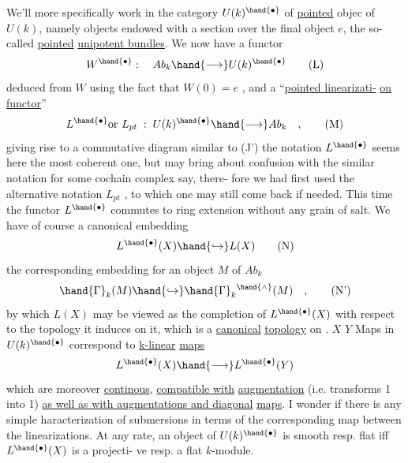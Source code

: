 
We'll more specifically work in the category $U(k)^\hand{\bullet}$ of \uline{pointed} objec
of $U(k)$, namely objects endowed with a section over the final object $e$,
the so-called \uline{pointed} \uline{unipotent bundles}. We now have a functor
\[ W^\hand{\bullet} : \quad Ab_k \hand{\longrightarrow} U(k)^\hand{\bullet} \tag{L} \]
deduced from $W$ using the fact that $W(0)=e$ , and a ``\uline{pointed linearizati-}%
\uline{on functor}''
\[ L^\hand{\bullet} \text{or } L_{pt} \;:\; U(k)^\hand{\bullet} \hand{\longrightarrow} Ab_k \quad , \tag{M} \]
giving rise to a commutative diagram similar to (J')
the notation $L^\hand{\bullet}$ seems here the most coherent one, but may bring about
confusion with the similar notation for some cochain complex say, there-%
fore we had first used the alternative notation $L_{pt}$ , to which one may
still come back if needed. This time the functor $L^\hand{\bullet}$ commutes to ring
extension without any grain of salt. We have of course a canonical
embedding
\[ L^\hand{\bullet}(X) \hand{\hookrightarrow} L(X) \tag{N} \]
  the corresponding embedding for an object $M$ of $Ab_k$
\[ \hand{\Gamma}_k(M) \hand{\hookrightarrow} \hand{\Gamma}_k{}^{\hand{\wedge}}(M) \quad , \tag{N'} \]
by which $L(X)$ may be viewed as the completion of $L^\hand{\bullet}(X)$ with respect to
the topology it induces on it, which is a \uline{canonical} \uline{topology} on .
$X$ \quad $Y$
Maps in $U(k)^\hand{\bullet}$ correspond to \uline{k-linear} \uline{maps}
\[ L^\hand{\bullet}(X) \hand{\longrightarrow} L^\hand{\bullet}(Y) \]
which are moreover \uline{continous},  \uline{compatible with} \uline{augmentation}
(i.e. transforms 1 into 1) \uline{as well as with augmentations and diagonal}
\uline{maps}. I wonder if there is any simple haracterization of submersions
 in terms of the corresponding map between the linearizations. At any
rate, an object  of $U(k)^\hand{\bullet}$ is smooth resp. flat iff $L^\hand{\bullet}(X)$ is a projecti-%
ve resp. a flat $k$-module.

